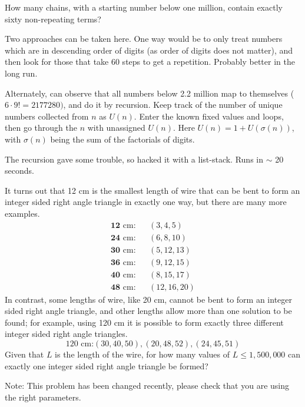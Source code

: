 How many chains, with a starting number below one million, contain exactly sixty non-repeating terms?

\vspace{-1cm}
Two approaches can be taken here.  One way would be to only treat numbers which are in descending order of digits (as order 
of digits does not matter), and then look for those that take 60 steps to get a repetition.  Probably better in the long run.

Alternately, can observe that all numbers below 2.2 million map to themselves ($6\cdot 9! = 2177280)$, and do it by recursion. Keep track of the number of unique numbers collected from $n$ as $U(n)$.   Enter the known fixed values and loops, then go through the $n$ with unassigned $U(n)$.  Here $U(n) = 1+U(\sigma(n))$, with $\sigma(n)$ being the sum of the factorials of digits.  

\footnotesize
The recursion gave some trouble, so hacked it with a list-stack.  Runs in  $\sim$ 20 seconds.
\normalsize
%




It turns out that 12 cm is the smallest length of wire that can be bent to form an integer sided right angle triangle in exactly one way, but there are many more examples.
\begin{eqnarray*}
\textbf{12} \text{ cm}: &&(3,4,5)    \\
\textbf{24} \text{ cm}: &&(6,8,10)   \\
\textbf{30} \text{ cm}: &&(5,12,13)  \\
\textbf{36} \text{ cm}: &&(9,12,15)  \\
\textbf{40} \text{ cm}: &&(8,15,17)  \\
\textbf{48} \text{ cm}: &&(12,16,20)
\end{eqnarray*}
In contrast, some lengths of wire, like 20 cm, cannot be bent to form an integer sided right angle triangle, and other lengths allow more than one solution to be found; for example, using 120 cm it is possible to form exactly three different integer sided right angle triangles.
$$\text{120 cm:} (30,40,50), (20,48,52), (24,45,51)$$
Given that $L$ is the length of the wire, for how many values of $L \leq 1,500,000$ can exactly one integer sided right angle triangle be formed?

\footnotesize
Note: This problem has been changed recently, please check that you are using the right parameters.
\normalsize

